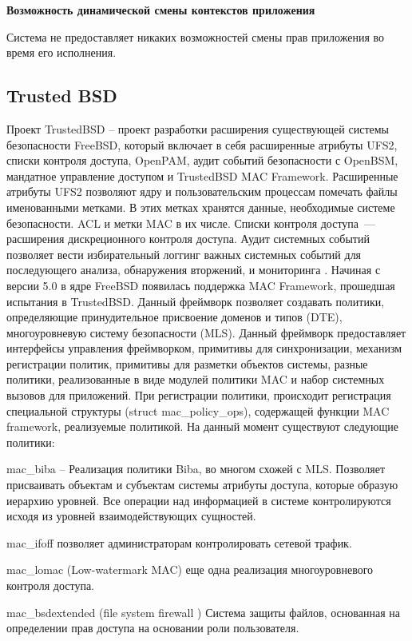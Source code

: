 \bigskip
{\bfseries Возможность динамической смены контекстов 
приложения } 

Система не предоставляет никаких возможностей 
смены прав приложения во время его исполнения. 

\subsection{Trusted BSD} 

Проект TrustedBSD – проект разработки 
расширения существующей системы 
безопасности FreeBSD, который включает 
в себя  расширенные атрибуты UFS2, 
списки контроля доступа, OpenPAM, аудит событий 
безопасности с OpenBSM, мандатное управление доступом 
и TrustedBSD MAC Framework. 
Расширенные атрибуты UFS2 позволяют ядру и 
пользовательским процессам помечать файлы 
именованными метками. В этих метках
хранятся данные, необходимые системе безопасности. 
ACL и метки MAC в их числе. Списки контроля доступа~--- 
 расширения дискреционного контроля доступа. Аудит 
системных событий позволяет вести избирательный 
логгинг важных системных событий для последующего 
анализа, обнаружения вторжений, и мониторинга  
. Начиная с версии 5.0 в ядре FreeBSD 
появилась поддержка MAC Framework, прошедшая испытания 
в TrustedBSD. Данный фреймворк позволяет создавать политики, 
определяющие принудительное присвоение доменов и типов (DTE), 
многоуровневую систему безопасности (MLS). Данный фреймворк 
предоставляет интерфейсы управления фреймворком, примитивы 
для синхронизации, механизм регистрации политик, примитивы 
для разметки объектов системы, разные политики, 
реализованные в виде модулей политики MAC и набор 
системных вызовов для приложений. При регистрации 
политики, происходит регистрация специальной структуры 
(struct mac\_policy\_ops), содержащей функции MAC 
framework, реализуемые политикой. На данный момент 
существуют следующие политики: 

mac\_biba – Реализация политики Biba, во многом 
схожей с MLS. Позволяет присваивать объектам и 
субъектам системы атрибуты доступа, которые образую 
иерархию уровней. Все операции над информацией в 
системе контролируются исходя из уровней 
взаимодействующих сущностей. 

mac\_ifoff позволяет администраторам контролировать 
сетевой трафик. 

mac\_lomac (Low-watermark MAC) еще одна 
реализация многоуровневого контроля доступа. 

mac\_bsdextended (file system firewall ) Система 
защиты файлов, основанная на определении прав 
доступа на основании роли пользователя. 

